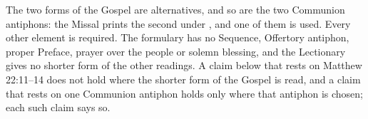 \noindent The two forms of the Gospel are alternatives, and so are the two
Communion antiphons: the Missal prints the second under , and one of
them is used. Every other element is required. The formulary has no Sequence,
Offertory antiphon, proper Preface, prayer over the people or solemn blessing,
and the Lectionary gives no shorter form of the other readings. A claim below
that rests on Matthew 22:11--14 does not hold where the shorter form of the
Gospel is read, and a claim that rests on one Communion antiphon holds only
where that antiphon is chosen; each such claim says so.
